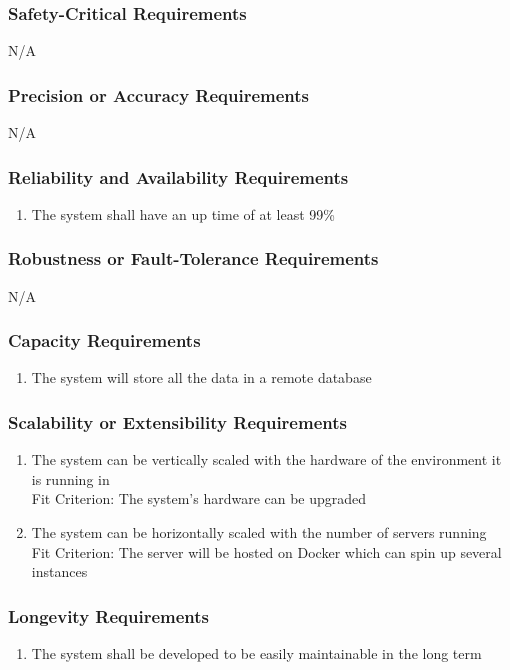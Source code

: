\documentclass[12pt, titlepage]{article}
\begin{document}
	\subsubsection{Safety-Critical Requirements}
	N/A
	\subsubsection{Precision or Accuracy Requirements}
	N/A
	\subsubsection{Reliability and Availability Requirements}
	\begin{enumerate}[resume*]
		\item The system shall have an up time of at least 99\%
	\end{enumerate}
	\subsubsection{Robustness or Fault-Tolerance Requirements}
	N/A
	\subsubsection{Capacity Requirements}
	\begin{enumerate}[resume*]
		\item The system will store all the data in a remote database
	\end{enumerate}
	\subsubsection{Scalability or Extensibility Requirements}
	\begin{enumerate}[resume*]
		\item The system can be vertically scaled with the hardware of the environment it is running in \\
		{\color{red}Fit Criterion: The system's hardware can be upgraded}
		\item The system can be horizontally scaled with the number of servers running \\
		{\color{red}Fit Criterion: The server will be hosted on Docker which can spin up several instances}
	\end{enumerate}
	\subsubsection{Longevity Requirements}
	\begin{enumerate}[resume*]
		\item The system shall be developed to be easily maintainable in the long term
	\end{enumerate}
\end{document}
